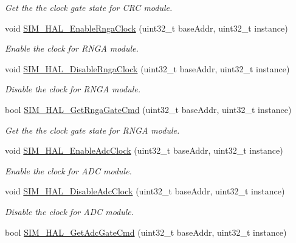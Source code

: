 \begin{DoxyCompactItemize}
\begin{DoxyCompactList}\small\item\em Get the the clock gate state for C\+RC module. \end{DoxyCompactList}\item 
void \hyperlink{group__sim__hal_ga285fb9a267a1a74f5c5fbb7bd04ff405}{S\+I\+M\+\_\+\+H\+A\+L\+\_\+\+Enable\+Rnga\+Clock} (uint32\+\_\+t base\+Addr, uint32\+\_\+t instance)
\begin{DoxyCompactList}\small\item\em Enable the clock for R\+N\+GA module. \end{DoxyCompactList}\item 
void \hyperlink{group__sim__hal_ga841eface2a3b253f8a77d1219f3b2e55}{S\+I\+M\+\_\+\+H\+A\+L\+\_\+\+Disable\+Rnga\+Clock} (uint32\+\_\+t base\+Addr, uint32\+\_\+t instance)
\begin{DoxyCompactList}\small\item\em Disable the clock for R\+N\+GA module. \end{DoxyCompactList}\item 
bool \hyperlink{group__sim__hal_ga202d7ea0f925f488fb7885602f51105f}{S\+I\+M\+\_\+\+H\+A\+L\+\_\+\+Get\+Rnga\+Gate\+Cmd} (uint32\+\_\+t base\+Addr, uint32\+\_\+t instance)
\begin{DoxyCompactList}\small\item\em Get the the clock gate state for R\+N\+GA module. \end{DoxyCompactList}\item 
void \hyperlink{group__sim__hal_ga19dfc8d78a979c2800e32d003dfb76a7}{S\+I\+M\+\_\+\+H\+A\+L\+\_\+\+Enable\+Adc\+Clock} (uint32\+\_\+t base\+Addr, uint32\+\_\+t instance)
\begin{DoxyCompactList}\small\item\em Enable the clock for A\+DC module. \end{DoxyCompactList}\item 
void \hyperlink{group__sim__hal_gabdae7776e96ffa46d785a4f7f1222e94}{S\+I\+M\+\_\+\+H\+A\+L\+\_\+\+Disable\+Adc\+Clock} (uint32\+\_\+t base\+Addr, uint32\+\_\+t instance)
\begin{DoxyCompactList}\small\item\em Disable the clock for A\+DC module. \end{DoxyCompactList}\item 
bool \hyperlink{group__sim__hal_ga7ff8f04f19ecae55451daadb2b4e6ca2}{S\+I\+M\+\_\+\+H\+A\+L\+\_\+\+Get\+Adc\+Gate\+Cmd} (uint32\+\_\+t base\+Addr, uint32\+\_\+t instance)

\end{DoxyCompactItemize}
